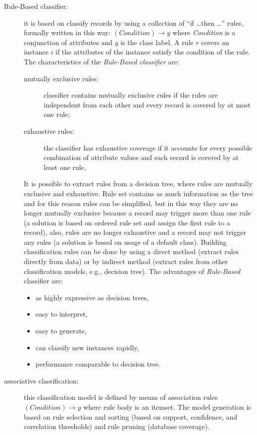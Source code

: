 \begin{description}
	\item[Rule-Based classifier:] it is based on classify records by using a collection of ``if \ldots then \ldots'' rules, formally written in this way: $\left(Condition\right) \to y$ where \emph{Condition} is a conjunction of attributes and $y$ is the class label.
	A rule $r$ covers an instance $i$ if the attributes of the instance satisfy the condition of the rule.
	The characteristics of the \emph{Rule-Based classifier} are:
	\begin{description}
		\item[mutually exclusive rules:] classifier contains mutually exclusive rules if the rules are independent from each other and every record is covered by at most one rule;
		\item[exhaustive rules:] the classifier has exhaustive coverage if it accounts for every possible combination of attribute values and each record is covered by at least one rule.
	\end{description}
	It is possible to extract rules from a decision tree, where rules are mutually exclusive and exhaustive.
	Rule set contains as much information as the tree and for this reason rules can be simplified, but in this way they are no longer mutually exclusive because a record may trigger more than one rule (a solution is based on ordered rule set and assign the first rule to a record), also, rules are no longer exhaustive and a record may not trigger any rules (a solution is based on usage of a default class).
	Building classification rules can be done by using a direct method (extract rules directly from data) or by indirect method (extract rules from other classification models, e.g., decision tree).
	The advantages of \emph{Rule-Based} classifier are:
	\begin{itemize}
		\item
		as highly expressive as decision trees,
		\item
		easy to interpret,
		\item
		easy to generate,
		\item
		can classify new instances rapidly,
		\item
		performance comparable to decision tree.
	\end{itemize}
	\item[associative classification:] this classification model is defined by means of association rules $\left(Condition\right) \to y$ where rule body is an itemset.
	The model generation is based on rule selection and sorting (based on support, confidence, and correlation thresholds) and rule pruning (database coverage).

\end{description}
